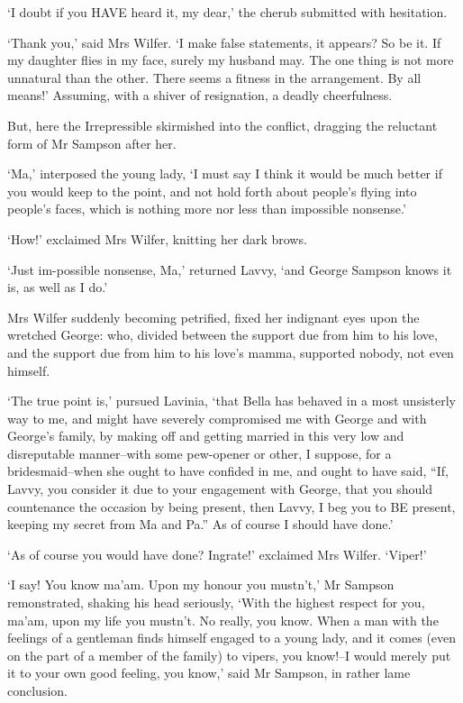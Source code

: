 ‘I doubt if you HAVE heard it, my dear,’ the cherub submitted with
hesitation.

‘Thank you,’ said Mrs Wilfer. ‘I make false statements, it appears? So
be it. If my daughter flies in my face, surely my husband may. The one
thing is not more unnatural than the other. There seems a fitness in the
arrangement. By all means!’ Assuming, with a shiver of resignation, a
deadly cheerfulness.

But, here the Irrepressible skirmished into the conflict, dragging the
reluctant form of Mr Sampson after her.

‘Ma,’ interposed the young lady, ‘I must say I think it would be much
better if you would keep to the point, and not hold forth about
people’s flying into people’s faces, which is nothing more nor less than
impossible nonsense.’

‘How!’ exclaimed Mrs Wilfer, knitting her dark brows.

‘Just im-possible nonsense, Ma,’ returned Lavvy, ‘and George Sampson
knows it is, as well as I do.’

Mrs Wilfer suddenly becoming petrified, fixed her indignant eyes upon
the wretched George: who, divided between the support due from him to
his love, and the support due from him to his love’s mamma, supported
nobody, not even himself.

‘The true point is,’ pursued Lavinia, ‘that Bella has behaved in a most
unsisterly way to me, and might have severely compromised me with George
and with George’s family, by making off and getting married in this very
low and disreputable manner--with some pew-opener or other, I suppose,
for a bridesmaid--when she ought to have confided in me, and ought
to have said, “If, Lavvy, you consider it due to your engagement with
George, that you should countenance the occasion by being present, then
Lavvy, I beg you to BE present, keeping my secret from Ma and Pa.” As of
course I should have done.’

‘As of course you would have done? Ingrate!’ exclaimed Mrs Wilfer.
‘Viper!’

‘I say! You know ma’am. Upon my honour you mustn’t,’ Mr Sampson
remonstrated, shaking his head seriously, ‘With the highest respect for
you, ma’am, upon my life you mustn’t. No really, you know. When a man
with the feelings of a gentleman finds himself engaged to a young lady,
and it comes (even on the part of a member of the family) to vipers, you
know!--I would merely put it to your own good feeling, you know,’ said
Mr Sampson, in rather lame conclusion.


